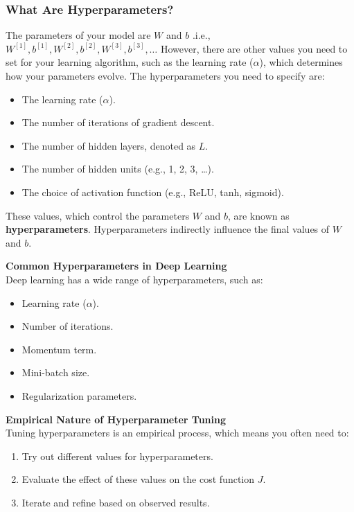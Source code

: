 \documentclass[letterpaper,12pt,notitlepage,twoside]{report}
\begin{document}
\subsubsection*{What Are Hyperparameters?}
The parameters of your model are \( W \) and \( b \) .i.e.,  \( W^{[1]},  b^{[1]}, W^{[2]}, b^{[2]}, W^{[3]}, b^{[3]}, \dots \) However, there are other values you need to set for your learning algorithm, such as the learning rate (\( \alpha \)), which determines how your parameters evolve. The hyperparameters you need to specify are: 
\begin{itemize}[nosep]
    \item The learning rate (\( \alpha \)).
    \item The number of iterations of gradient descent.
    \item The number of hidden layers, denoted as \( L \).
    \item The number of hidden units (e.g., 1, 2, 3, \dots).
    \item The choice of activation function (e.g., ReLU, tanh, sigmoid).
\end{itemize}

These values, which control the parameters \( W \) and \( b \), are known as \textbf{hyperparameters}. Hyperparameters indirectly influence the final values of \( W \) and \( b \).

\textbf{Common Hyperparameters in Deep Learning} \\
Deep learning has a wide range of hyperparameters, such as:
\begin{itemize}[nosep]
    \item Learning rate (\( \alpha \)).
    \item Number of iterations.
    \item Momentum term.
    \item Mini-batch size.
    \item Regularization parameters.
\end{itemize}

\textbf{Empirical Nature of Hyperparameter Tuning} \\
Tuning hyperparameters is an empirical process, which means you often need to:
\begin{enumerate}[nosep]
    \item Try out different values for hyperparameters.
    \item Evaluate the effect of these values on the cost function \( J \).
    \item Iterate and refine based on observed results.
\end{enumerate}
\end{document}
